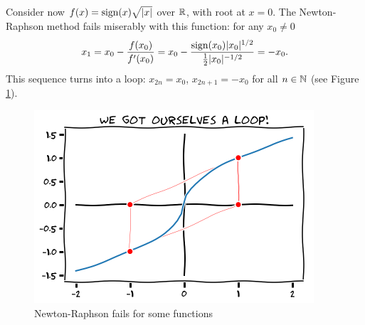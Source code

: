 \begin{example}\label{example:NewtonRaphsonloop}
Consider now $f(x) = \operatorname{sign}(x)\sqrt{\lvert x \rvert}$ over $\mathbb{R}$, with root at $x=0$.  The Newton-Raphson method fails miserably with this function: for any $x_0 \neq 0$
\begin{align*}
x_1 = x_0 - \frac{f(x_0)}{f'(x_0)} = x_0 - \frac{\operatorname{sign}(x_0)\lvert x_0 \rvert^{1/2}}{\tfrac{1}{2}\lvert x_0 \rvert^{-1/2}} = -x_0.
\end{align*}
This sequence turns into a loop: $x_{2n}=x_0$, $x_{2n+1}=-x_0$ for all $n\in \mathbb{N}$ (see Figure \ref{figure:NewtonRaphsonloop}).
\begin{figure}[ht!]
\includegraphics[width=0.65\linewidth]{loop.png}
\caption{Newton-Raphson fails for some functions}
\label{figure:NewtonRaphsonloop}
\end{figure}
\end{example}

